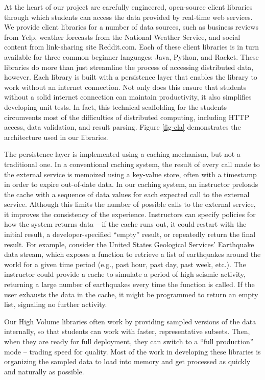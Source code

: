 At the heart of our project are carefully engineered, open-source client libraries through which students can access the data provided by real-time web services.
We provide client libraries for a number of data sources, such as business reviews from Yelp, weather forecasts from the National Weather Service, and social content from link-sharing site Reddit.com.
Each of these client libraries is in turn available for three common beginner languages: Java, Python, and Racket. 
These libraries do more than just streamline the process of accessing distributed data, however. Each library is built with a persistence layer that enables the library to work without an internet connection.
Not only does this ensure that students without a solid internet connection can maintain productivity, it also simplifies developing unit tests. 
In fact, this technical scaffolding for the students circumvents most of the difficulties of distributed computing, including HTTP access, data validation, and result parsing.
Figure \ref{fig-cla} demonstrates the architecture used in our libraries.

The persistence layer is implemented using a caching mechanism, but not a traditional one.
In a conventional caching system, the result of every call made to the external service is memoized using a key-value store, often with a timestamp in order to expire out-of-date data.
In our caching system, an instructor preloads the cache with a sequence of data values for each expected call to the external service.
Although this limits the number of possible calls to the external service, it improves the consistency of the experience.
Instructors can specify policies for how the system returns data -- if the cache runs out, it could restart with the initial result, a developer-specified ``empty'' result, or repeatedly return the final result.
For example, consider the United States Geological Services' Earthquake data stream, which exposes a function to retrieve a list of earthquakes around the world for a given time period (e.g., past hour, past day, past week, etc.). 
The instructor could provide a cache to simulate a period of high seismic activity, returning a large number of earthquakes every time the function is called.
If the user exhausts the data in the cache, it might be programmed to return an empty list, signaling no further activity.

Our High Volume libraries often work by providing sampled versions of the data internally, so that students can work with faster, representative subsets.
Then, when they are ready for full deployment, they can switch to a ``full production'' mode -- trading speed for quality. 
Most of the work in developing these libraries is organizing the sampled data to load into memory and get processed as quickly and naturally as possible.

